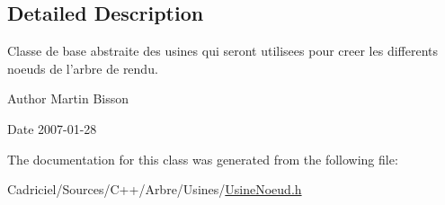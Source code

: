 \subsection{Detailed Description}
Classe de base abstraite des usines qui seront utilisees pour creer les differents noeuds de l'arbre de rendu. 

\begin{DoxyAuthor}{Author}
Martin Bisson 
\end{DoxyAuthor}
\begin{DoxyDate}{Date}
2007-\/01-\/28 
\end{DoxyDate}


The documentation for this class was generated from the following file\-:\begin{DoxyCompactItemize}
\item 
Cadriciel/\-Sources/\-C++/\-Arbre/\-Usines/\hyperlink{_usine_noeud_8h}{Usine\-Noeud.\-h}\end{DoxyCompactItemize}
